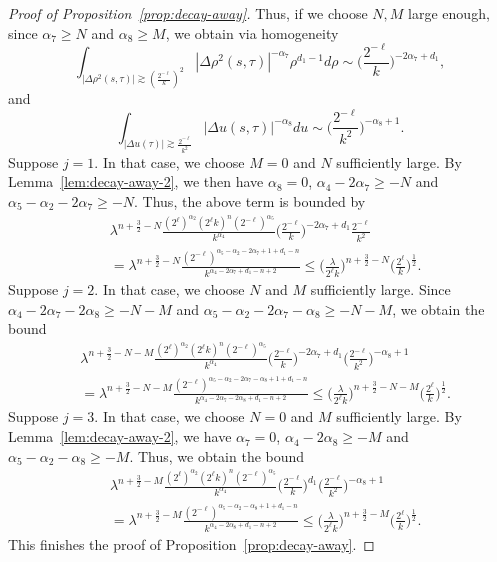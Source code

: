 \documentclass[leqno]{amsart}
\theoremstyle{definition}
\theoremstyle{remark}
\numberwithin{equation}{section}
\begin{document}
\begin{proof}[Proof of Proposition~\ref{prop:decay-away}]
Thus, if we choose $N,M$ large enough, since $\alpha_7\ge N$ and $\alpha_8\ge M$, we obtain via homogeneity
\[
\int_{\left|\Delta \rho^2(s,\tau)\right| \gtrsim (\frac{2^{-\ell}}{k})^2 } | \Delta \rho^2(s,\tau) |^{-\alpha_7} \rho^{d_1-1} d\rho \sim \Big(\frac{2^{-\ell}}{k}\Big)^{-2\alpha_7 + d_1},
\]
and 
\[
\int_{ |\Delta u (\tau)| \gtrsim \frac{2^{-\ell}}{k^2} } | \Delta u (s,\tau) |^{-\alpha_8} d u \sim \Big(\frac{2^{-\ell}}{k^2}\Big)^{-\alpha_8 + 1}.
\]
Suppose $j = 1$. In that case, we choose $M = 0$ and $N$ sufficiently large. By Lemma~\ref{lem:decay-away-2}, we then have $\alpha_8 = 0$, $\alpha_ 4 -2\alpha_7\ge -N$ and $\alpha_5-\alpha_2-2\alpha_7\ge -N$. Thus, the above term is bounded by
\begin{align*}
&\lambda^{n + \frac{3}{2}-N}
\frac{(2^{\ell})^{\alpha_2} (2^\ell k)^{n} (2^{-\ell})^{\alpha_5} }{k^{\alpha_ 4 } }
\Big(\frac{2^{-\ell}}{k}\Big)^{-2\alpha_7 + d_1}
\frac{2^{-\ell}}{k^2} \\
& = \lambda^{n + \frac{3}{2}-N} \frac{(2^{-\ell})^{\alpha_5-\alpha_2 - 2 \alpha_7 + 1 + d_1-n}}{k^{\alpha_ 4 -2\alpha_7+ d_1-n + 2}} 
 \le \Big( \frac{\lambda}{2^\ell k} \Big)^{n + \frac{3}{2}-N} \Big(\frac{2^{\ell}}{k}\Big)^{\frac 12}.
\end{align*}
Suppose $j = 2$. In that case, we choose $N$ and $M$ sufficiently large. Since $\alpha_ 4 -2\alpha_7-2\alpha_8\ge -N-M$ and $\alpha_5-\alpha_2-2\alpha_7-\alpha_8\ge -N-M$, we obtain the bound
\begin{align*} 
& \lambda^{n + \frac{3}{2}-N-M}
\frac{(2^{\ell})^{\alpha_2} (2^\ell k)^{n} (2^{-\ell})^{\alpha_5} }{k^{\alpha_ 4 } }
\Big(\frac{2^{-\ell}}{k}\Big)^{-2\alpha_7 + d_1}
\Big(\frac{2^{-\ell}}{k^2}\Big)^{-\alpha_8 + 1}\\
& = \lambda^{n + \frac{3}{2}-N-M} \frac{(2^{-\ell})^{\alpha_5-\alpha_2-2\alpha_7-\alpha_8 +1+ d_1-n}}{k^{\alpha_ 4 -2\alpha_7-2\alpha_8 + d_1-n + 2}} 
\le \Big( \frac{\lambda}{2^\ell k} \Big)^{n + \frac{3}{2}-N-M} \Big(\frac{2^{\ell}}{k}\Big)^{\frac 12}.
\end{align*}
Suppose $j = 3$. In that case, we choose $N = 0$ and $M$ sufficiently large. By Lemma~\ref{lem:decay-away-2}, we have $\alpha_7 = 0$, $\alpha_ 4 -2\alpha_8\ge -M$ and $\alpha_5-\alpha_2-\alpha_8\ge -M$. Thus, we obtain the bound 
\begin{align*} 
& \lambda^{n + \frac{3}{2}-M}
\frac{(2^{\ell})^{\alpha_2} (2^\ell k)^{n} (2^{-\ell})^{\alpha_5} }{k^{\alpha_ 4 } }
\Big(\frac{2^{-\ell}}{k}\Big)^{d_1} 
\Big(\frac{2^{-\ell}}{k^2}\Big)^{-\alpha_8 + 1} \\
& = \lambda^{n + \frac{3}{2}-M} \frac{(2^{-\ell})^{\alpha_5-\alpha_2-\alpha_8 +  1 +d_1-n}}{k^{\alpha_ 4 -2\alpha_8 + d_1-n + 2}} 
\le \Big( \frac{\lambda}{2^\ell k} \Big)^{n + \frac{3}{2}-M} \Big(\frac{2^{\ell}}{k}\Big)^{\frac 12}.
\end{align*}
This finishes the proof of Proposition~\ref{prop:decay-away}.
\end{proof}
\end{document}
